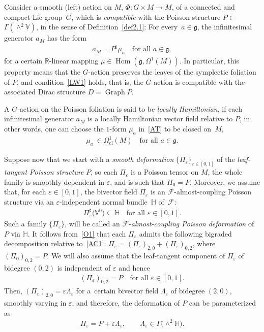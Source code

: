 \documentclass[10pt,a4paper]{amsart}
\numberwithin{equation}{section}
\begin{document}
Consider a smooth (left) action on $M$, $\Phi\colon G\times M\rightarrow M$, of a connected and compact Lie group~$G$, which is \emph{compatible} with the Poisson structure $P\in$ $\Gamma(\wedge ^{2}\mathbb{V})$, in the sense of Def\/inition~\ref{def2.1}: For every~$a\in\mathfrak{g}$, the inf\/initesimal generator $a_{M}$ has the form
\begin{gather}\label{AT}
a_{M}=P^{\sharp} \mu_{a}\quad \mbox{for all }a\in\mathfrak{g},
\end{gather}
for a certain $\mathbb{R}$-linear mapping $\mu\in\operatorname*{Hom}(\mathfrak{g},\Omega^{1}(M))$. In particular, this property means that the
$G$-action preserves the leaves of the symplectic foliation of $P$, and condition~\eqref{LW1} holds, that is, the $G$-action is compatible with the
associated Dirac structure $D=\operatorname*{Graph}P$.

A $G$-action on the Poisson foliation is said to be \emph{locally Hamiltonian}, if each inf\/initesimal generator $a_{M}$ is a locally Hamiltonian
vector f\/ield relative to $P$, in other words, one can choose the $1$-form $\mu_{a}$ in~\eqref{AT} to be closed on~$M$,
\begin{gather}\label{LH}%
\mu_{a}\ \in\Omega_{\operatorname*{cl}}^{1}(M)\quad \mbox{for all }a\in\mathfrak{g}.
\end{gather}

Suppose now that we start with a \emph{smooth deformation} $\{\Pi_\varepsilon\}_{\varepsilon\in [0,1]}$ of the \emph{leaf-tangent Poisson structure} $P$, so each $\Pi_{\varepsilon}$ is a Poisson tensor on $M$, the whole family is smoothly dependent in $\varepsilon$, and is such that $\Pi_{0}=P$. Moreover, we assume that, for each $\varepsilon\in [0,1]$, the bivector f\/ield $\Pi_{\varepsilon}$ is an $\mathcal{F}$-almost-coupling Poisson structure via an $\varepsilon$-independent normal bundle~$\mathbb{H}$ of~$\mathcal{F}$:
\begin{gather}\label{O1}
\Pi_{\varepsilon}^{\sharp}\big(\mathbb{V}^{0}\big)\subseteq\mathbb{H}\quad \mbox{for all }\varepsilon\in [0,1].
\end{gather}
Such a family $\{\Pi_{\varepsilon}\}$, will be called an $\mathcal{F}$-\emph{almost-coupling Poisson deformation} of $P$ via $\mathbb{H}$. It
follows from~\eqref{O1} that each $\Pi_{\varepsilon}$ admits the following bigraded decomposition relative to~\eqref{AC1}: $\Pi_{\varepsilon}=(\Pi_{\varepsilon})_{2,0}+(\Pi_{\varepsilon})_{0,2}$, where $(\Pi_0)_{0,2}=P$. We will also assume that the leaf-tangent component of $\Pi_{\varepsilon}$ of bidegree $(0,2)$ is independent of $\varepsilon$ and hence
\begin{gather*}%
(\Pi_{\varepsilon})_{0,2}=P\quad \mbox{for all }\varepsilon\in [0,1].
\end{gather*}
Then, $(\Pi_{\varepsilon})_{2,0}=\varepsilon\Lambda_{\varepsilon}$ for a~certain bivector f\/ield $\Lambda_{\varepsilon}$ of bidegree $(2,0)$, smoothly varying in $\varepsilon$, and therefore, the deformation of $P$ can be parameterized as
\begin{gather}\label{SD2}
\Pi_{\varepsilon}=P+\varepsilon\Lambda_{\varepsilon},\qquad \Lambda_{\varepsilon}\in\Gamma\big({\wedge}^{2}\mathbb{H}\big).
\end{gather}
\end{document}
